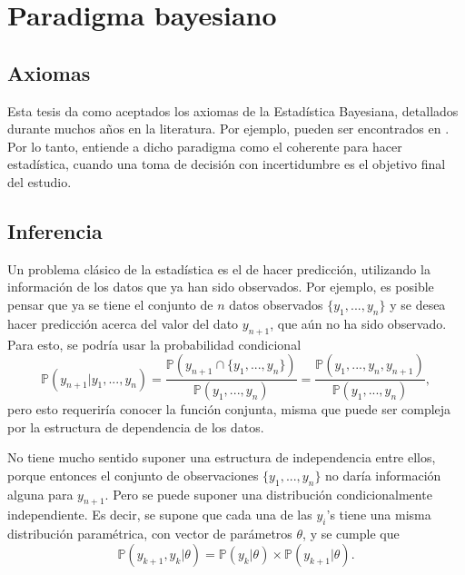 \chapter[Paradigma bayesiano]{Paradigma bayesiano\raisebox{.3\baselineskip}{\normalsize\footnotemark}}


\section{Axiomas}
Esta tesis da como aceptados los axiomas de la Estad\'istica Bayesiana, detallados durante muchos años en la literatura. Por ejemplo, pueden ser encontrados en \cite{Fishburn_Axioms}. Por lo tanto, entiende a dicho paradigma como el coherente para hacer estad\'istica, cuando una toma de decisi\'on con incertidumbre es el objetivo final del estudio. 

\section{Inferencia}

Un problema clásico de la estad\'istica es el de hacer predicci\'on, utilizando la informaci\'on de los datos que ya han sido observados. Por ejemplo, es posible pensar que ya se tiene el conjunto de $n$ datos observados $\{y_1, ..., y_n\}$ y se desea hacer predicci\'on acerca del valor del dato $y_{n+1}$, que a\'un no ha sido observado. Para esto, se podr\'ia usar la probabilidad condicional
\begin{equation*}
    \mathbb{P}(y_{n+1}|y_1,...,y_n) =
    \frac{\mathbb{P}(y_{n+1} \cap \{y_1, ..., y_n\})}{\mathbb{P}(y_1, ..., y_n)} =
    \frac{\mathbb{P}(y_1, ..., y_n,y_{n+1})}{\mathbb{P}(y_1, ..., y_n)},
\end{equation*}
pero esto requerir\'ia conocer la funci\'on conjunta, misma que puede ser compleja por la estructura de dependencia de los datos.

No tiene mucho sentido suponer una estructura de independencia entre ellos, porque entonces el conjunto de observaciones $\{y_1, ..., y_n\}$ no dar\'ia informaci\'on alguna para $y_{n+1}$. Pero se puede suponer una distribuci\'on condicionalmente independiente. Es decir, se supone que cada una de las $y_i$'s tiene una misma distribuci\'on param\'etrica, con vector de par\'ametros $\theta$, y se cumple que
\begin{equation*}
    \mathbb{P}(y_{k+1},y_k | \theta) =  \mathbb{P}(y_k | \theta) \times \mathbb{P}(y_{k+1} | \theta).
\end{equation*}

